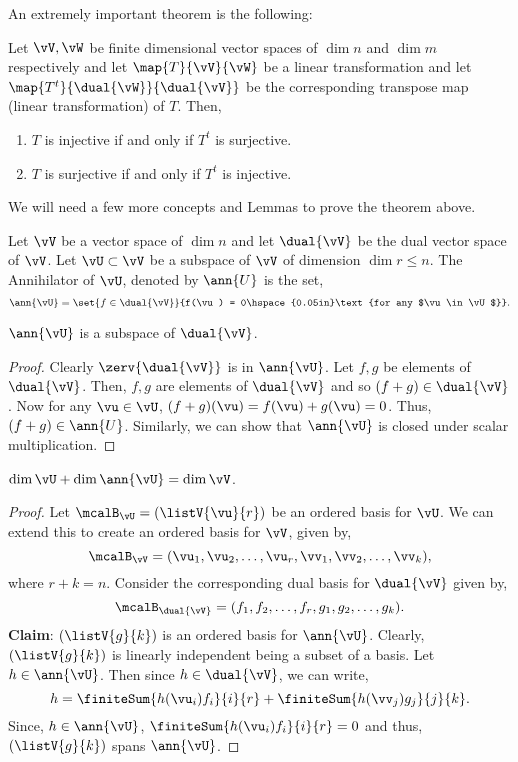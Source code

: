 An extremely important theorem is the following:
\begin{Theorem}\label{thm:tandttr}
    Let $\vV,\vW$ be finite dimensional vector spaces of $\dim{n}$ and $\dim{m}$ respectively and let 
    $\map{T}{\vV}{\vW}$ be a linear transformation and let $\map{T^{t}}{\dual{\vW}}{\dual{\vV}}$ be the
    corresponding transpose map (linear transformation) of $T$. Then,
    \begin{enumerate}
	\item $T$ is injective if and only if $T^{t}$ is surjective.
	\item $T$ is surjective if and only if $T^{t}$ is injective.
    \end{enumerate}
\end{Theorem}
We will need a few more concepts and Lemmas to prove the theorem above.
\begin{Definition}[name=Annihilator]
    Let $\vV$ be a vector space of $\dim{n}$ and let $\dual{\vV}$ be the dual vector space of $\vV$.
    Let $\vU \subset \vV$ be a subspace of $\vV$ of dimension $\dim{r} \leq n$. The Annihilator of $\vU$,
    denoted by $\ann{U}$ is the set,
    \[\ann{\vU} = \set{f\in\dual{\vV}}{f(\vu) = 0\hspace{0.05in}\text{for any $\vu \in \vU$}}.\]
\end{Definition}
\begin{Lemma}
    $\ann{\vU}$ is a subspace of $\dual{\vV}$.
\end{Lemma}
\begin{proof}
    Clearly $\zerv{\dual{\vV}}$ is in $\ann{\vU}$. Let $f,g$ be elements of $\dual{\vV}$. Then,
    $f,g$ are elements of $\dual{\vV}$ and so $(f+g)\in \dual{\vV}$. Now for any $\vu \in \vU$,
    $(f+g)(\vu) = f(\vu) + g(\vu) = 0$. Thus, $(f+g) \in \ann{U}$. Similarly, we can show that $\ann{\vU}$ is
    closed under scalar multiplication.
\end{proof}
\begin{Lemma}
    $\dim{\vU} + \dim{\ann{\vU}} = \dim{\vV}$.
\end{Lemma}
\begin{proof}
    Let $\mcalB_{\vU} = (\listV{\vu}{r})$ be an ordered basis for $\vU$. We can extend this to create an
    ordered basis for $\vV$, given by,
    \[\mcalB_{\vV} = (\vu_{1},\vu_{2},\dots,\vu_{r},\vv_{1},\vv_{2},\dots,\vv_{k}),\]
    where $r + k = n$. Consider the corresponding dual basis for $\dual{\vV}$ given by,
    \[\mcalB_{\dual{\vV}} = (f_{1},f_{2},\dots,f_{r},g_{1},g_{2},\dots,g_{k}).\]
    \textbf{Claim}: $(\listV{g}{k})$ is an ordered basis for $\ann{\vU}$.
    Clearly, $(\listV{g}{k})$ is linearly independent being a subset of a basis.
    Let $h \in \ann{\vU}$. Then since $h \in \dual{\vV}$, we can write,
    \[h = \finiteSum{h(\vu_{i})f_{i}}{i}{r} + \finiteSum{h(\vv_{j})g_{j}}{j}{k}.\]
    Since, $h \in \ann{\vU}$, $\finiteSum{h(\vu_{i})f_{i}}{i}{r} = 0$ and thus,
     $(\listV{g}{k})$ spans $\ann{\vU}$.
\end{proof}
